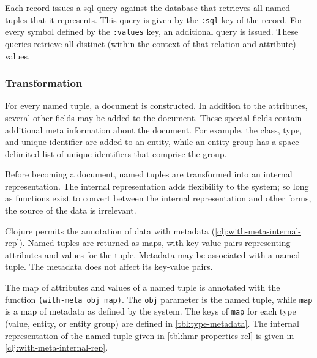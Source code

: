 			Each record issues a \gls{sql} query against the database that retrieves all named tuples that it represents.  This query is given by the \texttt{:sql} key of the record.  For every symbol defined by the \texttt{:values} key, an additional query is issued.  These queries retrieve all distinct (within the context of that relation and attribute) values.
		
		\subsubsection{Transformation}
			For every named tuple, a document is constructed.  In addition to the attributes, several other fields may be added to the document.  These special fields contain additional meta information about the document.  For example, the class, type, and unique identifier are added to an entity, while an entity group has a space-delimited list of unique identifiers that comprise the group.
			
			Before becoming a document, named tuples are transformed into an internal representation.  The internal representation adds flexibility to the system; so long as functions exist to convert between the internal representation and other forms, the source of the data is irrelevant.
			
			Clojure permits the annotation of data with metadata (\cref{clj:with-meta-internal-rep}).  Named tuples are returned as maps, with key-value pairs representing attributes and values for the tuple.  Metadata may be associated with a named tuple.  The metadata does not affect its key-value pairs.
			
			The map of attributes and values of a named tuple is annotated with the function \texttt{(with-meta obj map)}.  The \texttt{obj} parameter is the named tuple, while \texttt{map} is a map of metadata as defined by the system.  The keys of \texttt{map} for each type (value, entity, or entity group) are defined in \cref{tbl:type-metadata}.  The internal representation of the named tuple given in \cref{tbl:hmr-properties-rel} is given in \cref{clj:with-meta-internal-rep}.
			
